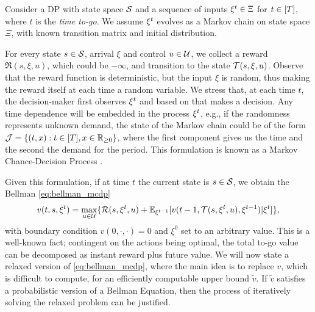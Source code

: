 Consider a DP with state space $\S$ and a sequence of inputs $\xit\in\Xi$ for $t\in[\T]$, where $t$ is the \emph{time to-go}.
We assume $\xit$ evolves as a Markov chain on state space $\Xi$, with known transition matrix and initial distribution.

For every state $s\in\S$, arrival $\xi$ and control $u\in\U$, we  collect a reward $\Re(s,\xi,u)$, which could be $-\infty$, and transition to the state $\Tr(s,\xi,u)$.
Observe that the reward function is deterministic, but the input $\xi$ is random, thus making the reward itself at each time a random variable.
We stress that, at each time $t$, the decision-maker first observes $\xit$ and based on that makes a decision.
Any time dependence will be embedded in the process $\xit$, e.g., if the randomness represents unknown demand, the state of the Markov chain could be of the form $\J=\crl{(t,x):t\in[\T],x\in\Rp}$, where the first component gives us the time and the second the demand for the period.
This formulation is known as a Markov Chance-Decision Process \cite[chap 13]{online_book}.

Given this formulation, if at time $t$ the current state is $s\in\S$, we obtain the Bellman \cref{eq:bellman_mcdp}
\begin{equation}\label{eq:bellman_mcdp}
v(t,s,\xit) = \max_{u\in\U}\crl{\Re(s,\xit,u) +\E_{\xi^{t-1}}[v(t-1,\Tr(s,\xit,u),\xi^{t-1})|\xit]},
\end{equation}
with boundary condition $v(0,\cdot,\cdot)=0$ and $\xi^0$ set to an arbitrary value.
This is a well-known fact; contingent on the actions being optimal, the total to-go value can be decomposed as instant reward plus future value.
We will now state a relaxed version of \cref{eq:bellman_mcdp}, where the main idea is to replace $v$, which is difficult to compute, for an efficiently computable upper bound $\tilde v$.
If $\tilde v$ satisfies a probabilistic version of a Bellman Equation, then the process of iteratively solving the relaxed problem can be justified.

 
